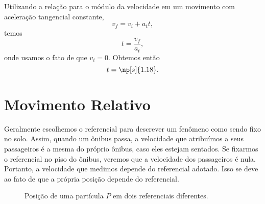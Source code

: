 Utilizando a relação para o módulo da velocidade em um movimento com aceleração tangencial constante,
\begin{equation}
	v_f = v_i + a_t t,
\end{equation}
%
temos
\begin{equation}
	t = \frac{v_f}{a_t},
\end{equation}
%
onde usamos o fato de que $v_i = 0$. Obtemos então
\begin{equation}
	t = \np[s]{1.18}.
\end{equation}

\section{Movimento Relativo}

Geralmente escolhemos o referencial para descrever um fenômeno como sendo fixo no solo. Assim, quando um ônibus passa, a velocidade que atribuímos a seus passageiros é a mesma do próprio ônibus, caso eles estejam sentados. Se fixarmos o referencial no piso do ônibus, veremos que a velocidade dos passageiros é nula. Portanto, a velocidade que medimos depende do referencial adotado. Isso se deve ao fato de que a própria posição depende do referencial.

\begin{figure}[!h]
\centering
{}
\caption{Posição de uma partícula $P$ em dois referenciais diferentes. \label{Fig:Ref_mov_relativo}}
\end{figure}

